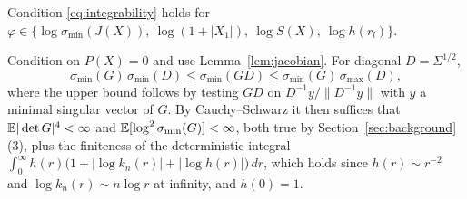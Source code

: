 \begin{lemma}\label{lem:integrability}
  Condition \eqref{eq:integrability} holds for
  $\varphi\in\{\log\sigma_{\min}(J(X)),\ \log(1+|X_1|),\ \log S(X),\ \log h(r_l)\}$.
\end{lemma}

\proofsketch
Condition on $P(X)=0$ and use Lemma~\ref{lem:jacobian}. For diagonal $D=\Sigma^{1/2}$,
\begin{equation}\label{eq:sandwich}
  \sigma_{\min}(G)\,\sigma_{\min}(D) \le \sigma_{\min}(GD)
  \le \sigma_{\min}(G)\,\sigma_{\max}(D),
\end{equation}
where the upper bound follows by testing $GD$ on $D^{-1}y/\|D^{-1}y\|$ with $y$ a minimal
singular vector of $G$. By Cauchy--Schwarz it then suffices that $\mathbb{E}|\det G|^4<\infty$ and
$\mathbb{E}[\log^2\sigma_{\min}(G)]<\infty$, both true by Section~\ref{sec:background}(3), plus the
finiteness of the deterministic integral
$\int_0^\infty h(r)\bigl(1+|\log k_n(r)|+|\log h(r)|\bigr)\,dr$, which holds since
$h(r)\sim r^{-2}$ and $\log k_n(r)\sim n\log r$ at infinity, and $h(0)=1$.
\endproof
